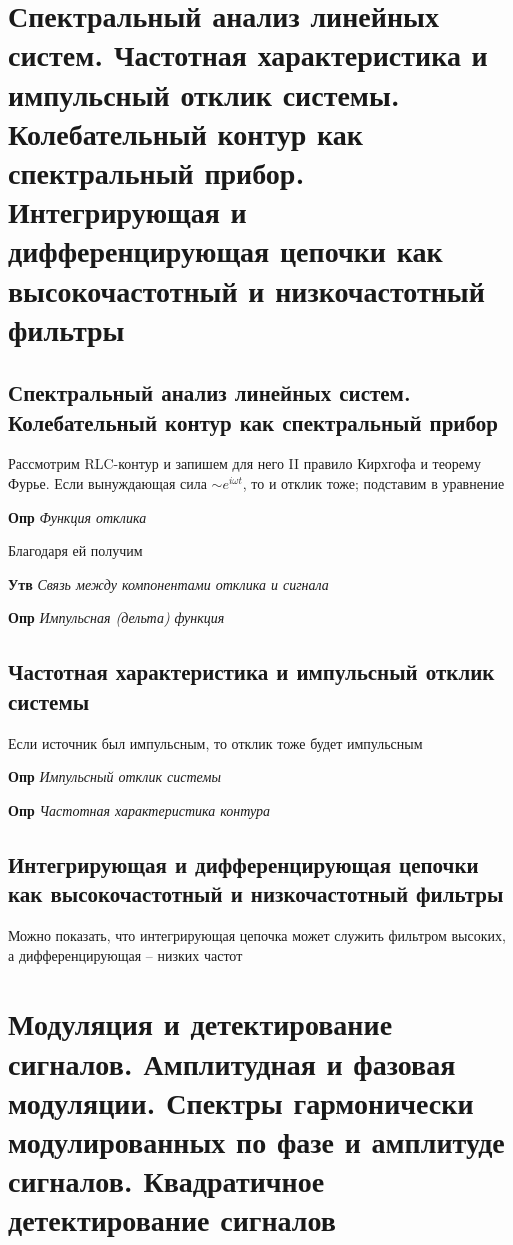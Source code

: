 \documentclass[a4paper, 14pt]{article}
\begin{document}
    \section{Спектральный анализ линейных систем.
    Частотная характеристика и импульсный отклик системы.
    Колебательный контур как спектральный прибор.
    Интегрирующая и дифференцирующая цепочки как высокочастотный и низкочастотный фильтры}
    
    \subsection{Спектральный анализ линейных систем. Колебательный контур как спектральный прибор}
    
    Рассмотрим RLC-контур и запишем для него II правило Кирхгофа и теорему Фурье.
    Если вынуждающая сила $\sim e^{i\omega t}$, то и отклик тоже; подставим в уравнение
    
    \textbf{Опр} \textit{Функция отклика}
    
    Благодаря ей получим
    
    \textbf{Утв} \textit{Связь между компонентами отклика и сигнала}
    
    \textbf{Опр} \textit{Импульсная (дельта) функция}
    
    \subsection{Частотная характеристика и импульсный отклик системы}
    
    Если источник был импульсным, то отклик тоже будет импульсным
    
    \textbf{Опр} \textit{Импульсный отклик системы}
    
    \textbf{Опр} \textit{Частотная характеристика контура}
    
    \subsection{Интегрирующая и дифференцирующая цепочки как высокочастотный и низкочастотный фильтры}
    
    Можно показать, что интегрирующая цепочка может служить фильтром высоких, а дифференцирующая -- низких частот
    
    \section{Модуляция и детектирование сигналов.
    Амплитудная и фазовая модуляции.
    Спектры гармонически модулированных по фазе и амплитуде сигналов.
    Квадратичное детектирование сигналов}
    
\end{document}
